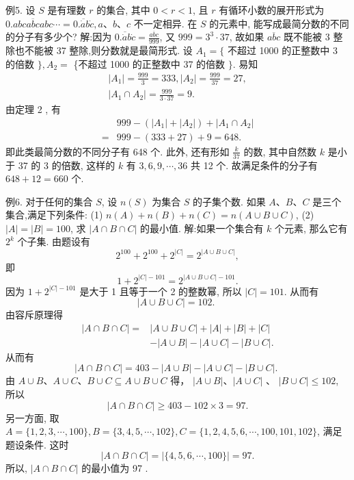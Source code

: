 例5. 设 $S$ 是有理数 $r$ 的集合, 其中 $0<r<1$, 且 $r$ 有循环小数的展开形式为 $\overline{0 . a b c a b c a b c \cdots}=\overline{0 .\dot{a} b \dot{c}}, a 、 b 、 c$ 不一定相异.
在 $S$ 的元素中, 能写成最简分数的不同的分子有多少个?
解:因为 $\overline{0 . \dot{a} b \dot{c}}=\frac{\overline{a b c}}{999}$, 又 $999=3^3 \cdot 37$, 故如果 $\overline{a b c}$ 既不能被 3 整除也不能被 37 整除,则分数就是最简形式.
设 $A_1=\{$ 不超过 1000 的正整数中 3 的倍数 $\}, A_2=$ \{不超过 1000 的正整数中 37 的倍数 $\}$. 易知
$$
\begin{gathered}
\left|A_1\right|=\frac{999}{3}=333,\left|A_2\right|=\frac{999}{37}=27, \\
\left|A_1 \cap A_2\right|=\frac{999}{3 \cdot 37}=9 .
\end{gathered}
$$
由定理 2 , 有
$$
\begin{aligned}
& 999-\left(\left|A_1\right|+\left|A_2\right|\right)+\left|A_1 \cap A_2\right| \\
= & 999-(333+27)+9=648 .
\end{aligned}
$$
即此类最简分数的不同分子有 648 个.
此外, 还有形如 $\frac{k}{37}$ 的数, 其中自然数 $k$ 是小于 37 的 3 的倍数, 这样的 $k$ 有 $3,6,9, \cdots, 36$ 共 12 个.
故满足条件的分子有 $648+12=660$ 个.



例6. 对于任何的集合 $S$, 设 $n(S)$ 为集合 $S$ 的子集个数.
如果 $A 、 B 、 C$ 是三个集合,满足下列条件:
(1) $n(A)+n(B)+n(C)=n(A \cup B \cup C)$,
(2) $|A|=|B|=100$,
求 $|A \cap B \cap C|$ 的最小值.
解:如果一个集合有 $k$ 个元素, 那么它有 $2^k$ 个子集.
由题设有
$$
2^{100}+2^{100}+2^{|C|}=2^{|A \cup B \cup C|},
$$
即
$$
1+2^{|C|-101}=2^{|A \cup B \cup C|-101} .
$$
因为 $1+2^{|C|-101}$ 是大于 1 且等于一个 2 的整数幂, 所以 $|C|=101$. 从而有
$$
|A \cup B \cup C|=102 \text {. }
$$
由容斥原理得
$$
\begin{aligned}
|A \cap B \cap C|= & |A \cup B \cup C|+|A|+|B|+|C| \\
& -|A \cup B|-|A \cup C|-|B \cup C| .
\end{aligned}
$$
从而有
$$
|A \cap B \cap C|=403-|A \cup B|-|A \cup C|-|B \cup C| \text {. }
$$
由 $A \cup B 、 A \cup C 、 B \cup C \subseteq A \cup B \cup C$ 得， $|A \cup B| 、|A \cup C|$ 、 $|B \cup C| \leqslant 102$, 所以
$$
|A \cap B \cap C| \geqslant 403-102 \times 3=97 .
$$
另一方面, 取 $A=\{1,2,3, \cdots, 100\}, B=\{3,4,5, \cdots, 102\}, C=\{1,2,4,5,6, \cdots, 100,101,102\}$, 满足题设条件.
这时
$$
|A \cap B \cap C|=|\{4,5,6, \cdots, 100\}|=97 .
$$
所以, $|A \cap B \cap C|$ 的最小值为 97 .



